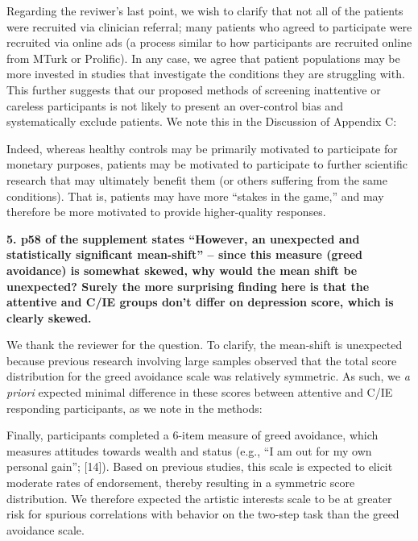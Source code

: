 \documentclass[a4paper,notitlepage,12pt]{article}
\begin{document}
Regarding the reviwer's last point, we wish to clarify that not all of the patients were recruited via clinician referral; many patients who agreed to participate were recruited via online ads (a process similar to how participants are recruited online from MTurk or Prolific). In any case, we agree that patient populations may be more invested in studies that investigate the conditions they are struggling with. This further suggests that our proposed methods of screening inattentive or careless participants is not likely to present an over-control bias and systematically exclude patients. We note this in the Discussion of Appendix C:

\begin{displayquote}
    Indeed, whereas healthy controls may be primarily motivated to participate for monetary purposes, patients may be motivated to participate to further scientific research that may ultimately benefit them (or others suffering from the same conditions). That is, patients may have more ``stakes in the game,'' and may therefore be more motivated to provide higher-quality responses.
\end{displayquote}

\textbf{5. p58 of the supplement states ``However, an unexpected and statistically significant mean-shift'' – since this measure (greed avoidance) is somewhat skewed, why would the mean shift be unexpected? Surely the more surprising finding here is that the attentive and C/IE groups don't differ on depression score, which is clearly skewed.}

We thank the reviewer for the question. To clarify, the mean-shift is unexpected because previous research involving large samples observed that the total score distribution for the greed avoidance scale was relatively symmetric. As such, we \textit{a priori} expected minimal difference in these scores between attentive and C/IE responding participants, as we note in the methods:

\begin{displayquote}
    Finally, participants completed a 6-item measure of greed avoidance, which measures attitudes towards wealth and status (e.g., ``I am out for my own personal gain''; [14]). Based on previous studies, this scale is expected to elicit moderate rates of endorsement, thereby resulting in a symmetric score distribution. We therefore expected the artistic interests scale to be at greater risk for spurious correlations with behavior on the two-step task than the greed avoidance scale.     
\end{displayquote}

\clearpage
\printbibliography
\end{document}
